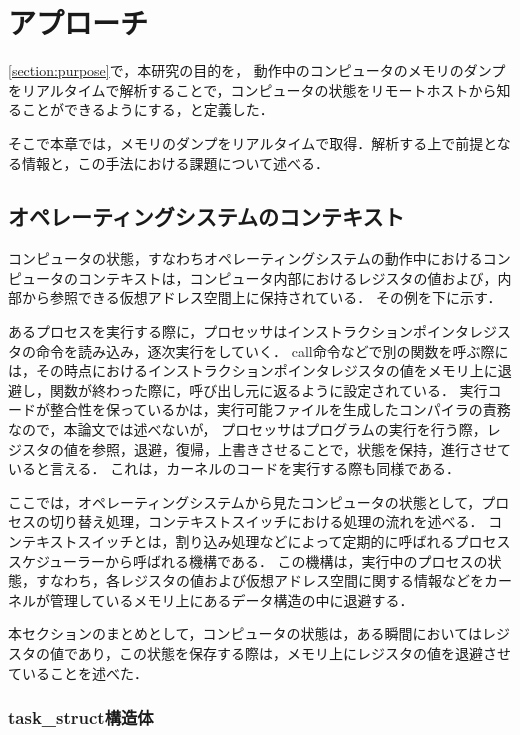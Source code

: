 \chapter{アプローチ}
\label{chap:approach}

\ref{section:purpose}で，本研究の目的を，
動作中のコンピュータのメモリのダンプをリアルタイムで解析することで，コンピュータの状態をリモートホストから知ることができるようにする，と定義した．

そこで本章では，メモリのダンプをリアルタイムで取得．解析する上で前提となる情報と，この手法における課題について述べる．

\section{オペレーティングシステムのコンテキスト}
\label{section:context}

コンピュータの状態，すなわちオペレーティングシステムの動作中におけるコンピュータのコンテキストは，コンピュータ内部におけるレジスタの値および，内部から参照できる仮想アドレス空間上に保持されている．
その例を下に示す．

あるプロセスを実行する際に，プロセッサはインストラクションポインタレジスタの命令を読み込み，逐次実行をしていく．
call命令などで別の関数を呼ぶ際には，その時点におけるインストラクションポインタレジスタの値をメモリ上に退避し，関数が終わった際に，呼び出し元に返るように設定されている．
実行コードが整合性を保っているかは，実行可能ファイルを生成したコンパイラの責務なので，本論文では述べないが，
プロセッサはプログラムの実行を行う際，レジスタの値を参照，退避，復帰，上書きさせることで，状態を保持，進行させていると言える．
これは，カーネルのコードを実行する際も同様である．

ここでは，オペレーティングシステムから見たコンピュータの状態として，プロセスの切り替え処理，コンテキストスイッチにおける処理の流れを述べる．
コンテキストスイッチとは，割り込み処理などによって定期的に呼ばれるプロセススケジューラーから呼ばれる機構である．
この機構は，実行中のプロセスの状態，すなわち，各レジスタの値および仮想アドレス空間に関する情報などをカーネルが管理しているメモリ上にあるデータ構造の中に退避する．

本セクションのまとめとして，コンピュータの状態は，ある瞬間においてはレジスタの値であり，この状態を保存する際は，メモリ上にレジスタの値を退避させていることを述べた．

\subsection{task\_struct構造体}

